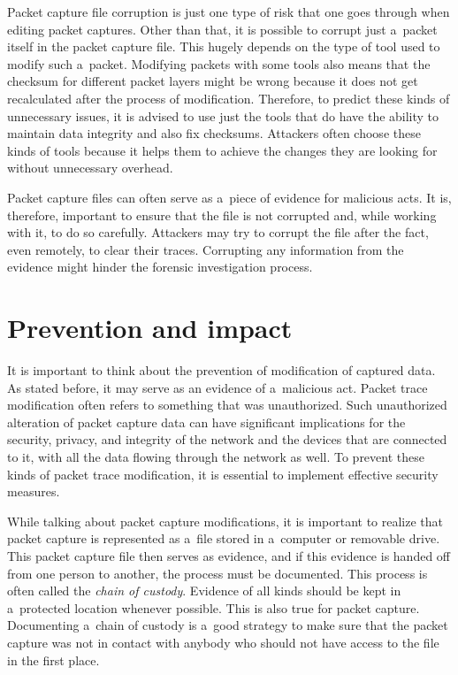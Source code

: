 \documentclass[
  printed,     %
  color,       %
  oneside,     %
  nosansbold,  %
  nocolorbold, %
  nolof,         %
  nolot,         %
]{fithesis4}
\begin{document}
Packet capture file corruption is just one type of risk that one goes through when editing packet captures. Other than that, it is possible to corrupt just a~packet itself in the packet capture file. This hugely depends on the type of tool used to modify such a~packet. Modifying packets with some tools also means that the checksum for different packet layers might be wrong because it does not get recalculated after the process of modification. Therefore, to predict these kinds of unnecessary issues, it is advised to use just the tools that do have the ability to maintain data integrity and also fix checksums. Attackers often choose these kinds of tools because it helps them to achieve the changes they are looking for without unnecessary overhead.

Packet capture files can often serve as a~piece of evidence for malicious acts. It is, therefore, important to ensure that the file is not corrupted and, while working with it, to do so carefully. Attackers may try to corrupt the file after the fact, even remotely, to clear their traces. Corrupting any information from the evidence might hinder the forensic investigation process.

\section{Prevention and impact}

It is important to think about the prevention of modification of captured data. As stated before, it may serve as an evidence of a~malicious act. Packet trace modification often refers to something that was unauthorized. Such unauthorized alteration of packet capture data can have significant implications for the security, privacy, and integrity of the network and the devices that are connected to it, with all the data flowing through the network as well. To prevent these kinds of packet trace modification, it is essential to implement effective security measures.

While talking about packet capture modifications, it is important to realize that packet capture is represented as a~file stored in a~computer or removable drive. This packet capture file then serves as evidence, and if this evidence is handed off from one person to another, the process must be documented. This process is often called the \textit{chain of custody}. Evidence of all kinds should be kept in a~protected location whenever possible. This is also true for packet capture. Documenting a~chain of custody is a~good strategy to make sure that the packet capture was not in contact with anybody who should not have access to the file in the first place.
\end{document}
